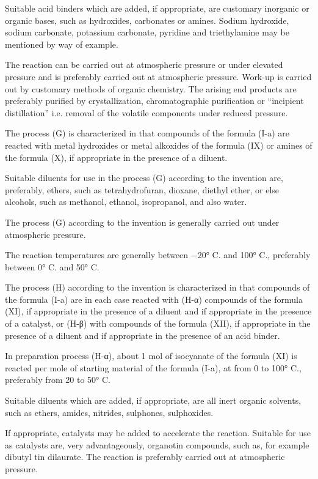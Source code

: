 \documentclass[11pt,a4paper]{article}
\begin{document}
Suitable acid binders which are added, if appropriate, are customary inorganic or organic bases, such as hydroxides, carbonates or amines. Sodium hydroxide, sodium carbonate, potassium carbonate, pyridine and triethylamine may be mentioned by way of example.

The reaction can be carried out at atmospheric pressure or under elevated pressure and is preferably carried out at atmospheric pressure. Work-up is carried out by customary methods of organic chemistry. The arising end products are preferably purified by crystallization, chromatographic purification or “incipient distillation” i.e. removal of the volatile components under reduced pressure.

The process (G) is characterized in that compounds of the formula (I-a) are reacted with metal hydroxides or metal alkoxides of the formula (IX) or amines of the formula (X), if appropriate in the presence of a diluent.

Suitable diluents for use in the process (G) according to the invention are, preferably, ethers, such as tetrahydrofuran, dioxane, diethyl ether, or else alcohols, such as methanol, ethanol, isopropanol, and also water.

The process (G) according to the invention is generally carried out under atmospheric pressure.

The reaction temperatures are generally between −20° C. and 100° C., preferably between 0° C. and 50° C.

The process (H) according to the invention is characterized in that compounds of the formula (I-a) are in each case reacted with (H-α) compounds of the formula (XI), if appropriate in the presence of a diluent and if appropriate in the presence of a catalyst, or (H-β) with compounds of the formula (XII), if appropriate in the presence of a diluent and if appropriate in the presence of an acid binder.

In preparation process (H-α), about 1 mol of isocyanate of the formula (XI) is reacted per mole of starting material of the formula (I-a), at from 0 to 100° C., preferably from 20 to 50° C.

Suitable diluents which are added, if appropriate, are all inert organic solvents, such as ethers, amides, nitrides, sulphones, sulphoxides.

If appropriate, catalysts may be added to accelerate the reaction. Suitable for use as catalysts are, very advantageously, organotin compounds, such as, for example dibutyl tin dilaurate. The reaction is preferably carried out at atmospheric pressure.
\end{document}
